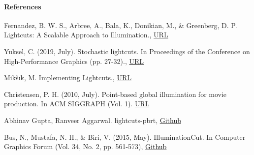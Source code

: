 \documentclass[twocolumn]{article}
\begin{document}
\paragraph{References} \hfill

Fernandez, B. W. S., Arbree, A., Bala, K., Donikian, M., \& Greenberg, D. P. Lightcuts: A Scalable Approach to Illumination., \href{https://www.cs.cornell.edu/~kb/projects/lightcuts/lightcuts.pdf}{URL}


Yuksel, C. (2019, July). Stochastic lightcuts. In Proceedings of the Conference on High-Performance Graphics (pp. 27-32)., \href{http://www.cemyuksel.com/research/stochasticlightcuts/stochasticlightcuts.pdf}{URL}


Mikšık, M. Implementing Lightcuts., \href{https://citeseerx.ist.psu.edu/document?repid=rep1&amp;type=pdf&amp;doi=36fc192f1d104453dce63644e9723332ae08bb4c}{URL}


Christensen, P. H. (2010, July). Point-based global illumination for movie production. In ACM SIGGRAPH (Vol. 1). \href{https://graphics.pixar.com/library/PointBasedGlobalIlluminationForMovieProduction/paper.pdf}{URL}

Abhinav Gupta, Ranveer Aggarwal. lightcuts-pbrt, \href{https://github.com/ranveeraggarwal/lightcuts-pbrt}{Github}


Bus, N., Mustafa, N. H., \& Biri, V. (2015, May). IlluminationCut. In Computer Graphics Forum (Vol. 34, No. 2, pp. 561-573), \href{https://github.com/winmad/IlluminationCut}{Github}
\end{document}
